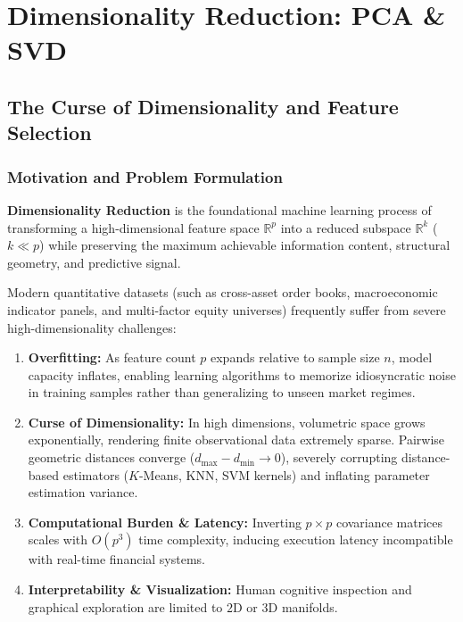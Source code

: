 \chapter{Dimensionality Reduction: PCA \& SVD}
\label{ch:dimensionality_reduction}

\section{The Curse of Dimensionality and Feature Selection}

\subsection{Motivation and Problem Formulation}
\textbf{Dimensionality Reduction} is the foundational machine learning process of transforming a high-dimensional feature space $\mathbb{R}^p$ into a reduced subspace $\mathbb{R}^k$ ($k \ll p$) while preserving the maximum achievable information content, structural geometry, and predictive signal.

Modern quantitative datasets (such as cross-asset order books, macroeconomic indicator panels, and multi-factor equity universes) frequently suffer from severe high-dimensionality challenges:
\begin{enumerate}
    \item \textbf{Overfitting:} As feature count $p$ expands relative to sample size $n$, model capacity inflates, enabling learning algorithms to memorize idiosyncratic noise in training samples rather than generalizing to unseen market regimes.
    \item \textbf{Curse of Dimensionality:} In high dimensions, volumetric space grows exponentially, rendering finite observational data extremely sparse. Pairwise geometric distances converge ($d_{\max} - d_{\min} \to 0$), severely corrupting distance-based estimators ($K$-Means, KNN, SVM kernels) and inflating parameter estimation variance.
    \item \textbf{Computational Burden \& Latency:} Inverting $p \times p$ covariance matrices scales with $O(p^3)$ time complexity, inducing execution latency incompatible with real-time financial systems.
    \item \textbf{Interpretability \& Visualization:} Human cognitive inspection and graphical exploration are limited to $2\text{D}$ or $3\text{D}$ manifolds.
\end{enumerate}

